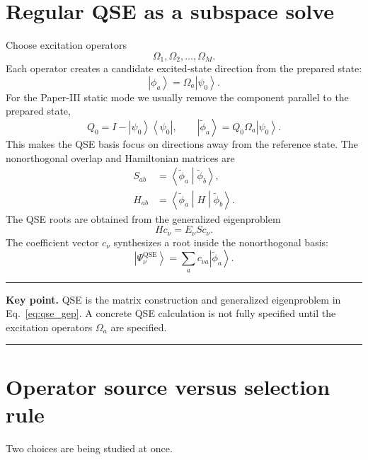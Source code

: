 \documentclass[10pt,twocolumn]{article}
\newcommand{\ket}[1]{\left|#1\right\rangle}
\newcommand{\bra}[1]{\left\langle#1\right|}
\newcommand{\braket}[2]{\left\langle#1\middle|#2\right\rangle}
\newcommand{\matel}[3]{\left\langle#1\middle|#2\middle|#3\right\rangle}
\newcommand{\QSE}{\mathrm{QSE}}
\newenvironment{paperbox}{\par\smallskip\noindent\begin{center}\begin{minipage}{0.94\linewidth}\small\hrule\smallskip}{\smallskip\hrule\end{minipage}\end{center}\smallskip}
\begin{document}
\section{Regular QSE as a subspace solve}
Choose excitation operators
\begin{equation}
  \Omega_1,\Omega_2,\ldots,\Omega_M.
\end{equation}
Each operator creates a candidate excited-state direction from the prepared state:
\begin{equation}
  \ket{\phi_a}=\Omega_a\ket{\psi_0}.
\end{equation}
For the Paper-III static mode we usually remove the component parallel to the prepared state,
\begin{equation}
  Q_0 = I-\ket{\psi_0}\bra{\psi_0},
  \qquad
  \ket{\tilde\phi_a}=Q_0\Omega_a\ket{\psi_0}.
\end{equation}
This makes the QSE basis focus on directions away from the reference state.  The nonorthogonal overlap and Hamiltonian matrices are
\begin{align}
  S_{ab} &= \braket{\tilde\phi_a}{\tilde\phi_b},\\
  H_{ab} &= \matel{\tilde\phi_a}{H}{\tilde\phi_b}.
\end{align}
The QSE roots are obtained from the generalized eigenproblem
\begin{equation}
  Hc_\nu = E_\nu Sc_\nu.
  \label{eq:qse_gep}
\end{equation}
The coefficient vector \(c_\nu\) synthesizes a root inside the nonorthogonal basis:
\begin{equation}
  \ket{\Psi_\nu^{\QSE}}
  =\sum_a c_{\nu a}\ket{\tilde\phi_a}.
\end{equation}

\begin{paperbox}
\textbf{Key point.}  QSE is the matrix construction and generalized eigenproblem in Eq.~\eqref{eq:qse_gep}.  A concrete QSE calculation is not fully specified until the excitation operators \(\Omega_a\) are specified.
\end{paperbox}

\section{Operator source versus selection rule}
Two choices are being studied at once.
\end{document}
